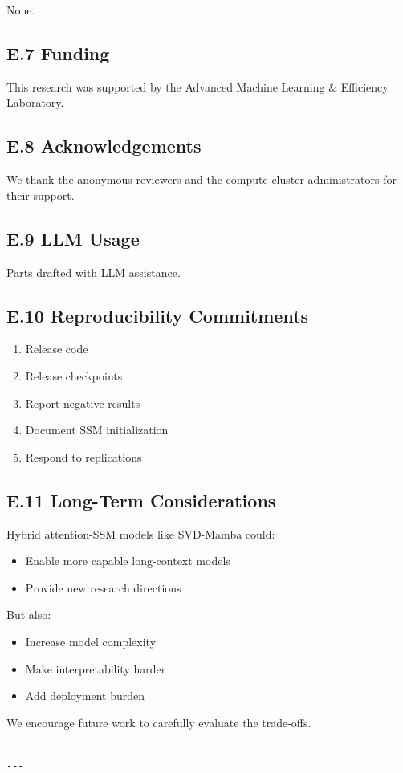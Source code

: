 None.

\subsection{E.7 Funding}

This research was supported by the Advanced Machine Learning \& Efficiency Laboratory.

\subsection{E.8 Acknowledgements}

We thank the anonymous reviewers and the compute cluster administrators for their support.

\subsection{E.9 LLM Usage}

Parts drafted with LLM assistance.

\subsection{E.10 Reproducibility Commitments}

\begin{enumerate}
\item Release code
\item Release checkpoints
\item Report negative results
\item Document SSM initialization
\item Respond to replications

\end{enumerate}
\subsection{E.11 Long-Term Considerations}

Hybrid attention-SSM models like SVD-Mamba could:

\begin{itemize}
\item Enable more capable long-context models
\item Provide new research directions

\end{itemize}
But also:

\begin{itemize}
\item Increase model complexity
\item Make interpretability harder
\item Add deployment burden

\end{itemize}
We encourage future work to carefully evaluate the trade-offs.
\begin{lstlisting}

---
\end{lstlisting}


